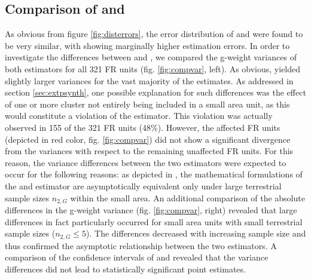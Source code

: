 %
%
%
%
%
%
%



\newpage
\subsection{Comparison of \psmall{} and \extpsynth{}}
\label{sec:comp}

As obvious from figure \ref{fig:disterrors}, the error distribution of \psmall{} and \extpsynth{} were found to be very similar, with \psmall{} showing marginally higher estimation errors. In order to investigate the differences between \psmall{} and \extpsynth{}, we compared the g-weight variances of both estimators for all 321 FR units (fig. \ref{fig:compvar}, left). As obvious, \psmall{} yielded slightly larger variances for the vast majority of the estimates. As addressed in section \ref{sec:extpsynth}, one possible explanation for such differences was the effect of one or more cluster not entirely being included in a small area unit, as this would constitute a violation of the \extpsynth{} estimator. This violation was actually observed in 155 of the 321 FR units (48\%). However, the affected FR units (depicted in red color, fig. \ref{fig:compvar}) did not show a significant divergence from the \psmall{} variances with respect to the remaining unaffected FR units. For this reason, the variance differences between the two estimators were expected to occur for the following reasons: as depicted in \citet[pp.17--18]{mandallaz2016}, the mathematical formulations of the \psmall{} and \extpsynth{} estimator are asymptotically equivalent only under large terrestrial sample sizes $n_{2,G}$ within the small area. An additional comparison of the absolute differences in the g-weight variance (fig. \ref{fig:compvar}, right) revealed that large differences in fact particularly occurred for small area units with small terrestrial sample sizes ($n_{2,G} \leq 5$). The differences decreased with increasing sample size and thus confirmed the asymptotic relationship between the two estimators. A comparison of the confidence intervals of \psmall{} and \extpsynth{} revealed that the variance differences did not lead to statistically significant point estimates.\par

